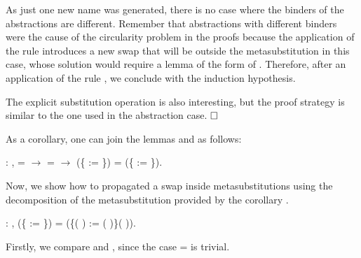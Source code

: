 \begin{coqdoccode}
\end{coqdoccode}
As just one new name was generated, there is no case where the binders of the abstractions are different. Remember that abstractions with different binders were the cause of the circularity problem in the proofs because the application of the rule  introduces a new swap that will be outside the metasubstitution in this case, whose solution would require a lemma of the form of . Therefore, after an application of the rule , we conclude with the induction hypothesis.
\begin{coqdoccode}
\end{coqdoccode}
The explicit substitution operation is also interesting, but the proof strategy is similar to the one used in the abstraction case. $\hfill\Box$
\begin{coqdoccode}
\coqdocemptyline
\end{coqdoccode}
As a corollary, one can join the lemmas  and  as follows:
\begin{coqdoccode}
\coqdocemptyline
\coqdocnoindent
{} : \coqdockw{\ensuremath{\forall}}     ,  =  \ensuremath{\rightarrow}  =  \ensuremath{\rightarrow} (\{ := \}) = (\{ := \}).\coqdoceol
\coqdocemptyline
\end{coqdoccode}
Now, we show how to propagated a swap inside metasubstitutions using the decomposition of the metasubstitution provided by the corollary .\newline 
\begin{coqdoccode}
\coqdocemptyline
\coqdocnoindent
{} : \coqdockw{\ensuremath{\forall}}     ,    (\{ := \}) = (\{(   ) := (   )\}(   )).\coqdoceol
\end{coqdoccode}
 Firstly, we compare  and , since the case  =  is trivial.
